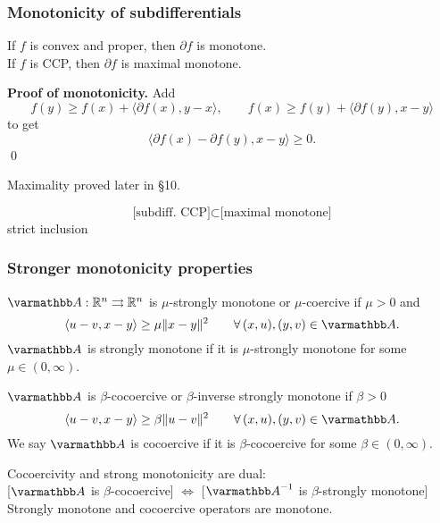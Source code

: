 \documentclass[10pt,mathserif]{beamer}
\begin{document}
\begin{frame}[plain]
\frametitle{Monotonicity of subdifferentials}
If $f$ is convex and proper, then $\partial f$ is monotone.\\
If $f$ is CCP, then $\partial f$ is maximal monotone.
\vspace{0.2in}

\textbf{Proof of monotonicity.}
Add
\[
f(y) \geq f(x) + \langle \partial f(x),y-x\rangle, \qquad f(x) \geq f(y) + \langle \partial f(y),x-y\rangle
\]
to get
\[
\langle\partial f(x)-\partial f(y),x-y\rangle\ge 0.
\]
\qed
\vspace{0.2in}


Maximality proved later in \S10.

\vspace{0.2in}


\[
\text{[subdiff.\ CCP]}\subset \text{[maximal monotone]}
\]
strict inclusion
\end{frame}


\begin{frame}
\frametitle{Stronger monotonicity properties}
$\opA:\reals^n\rightrightarrows\reals^n$ is $\mu$-strongly monotone or $\mu$-coercive
if $\mu>0$ and
\[
\langle u-v, x-y\rangle \geq \mu \|x-y\|^2
\qquad \forall\, (x,u),(y,v)\in \opA.
\]
$\opA $ is strongly monotone if it is $\mu$-strongly monotone for some $\mu \in(0,\infty)$.

\vspace{0.2in}

$\opA $ is $\beta$-cocoercive or $\beta$-inverse strongly monotone
if $\beta>0$
\[
\langle u-v, x-y\rangle \geq \beta \|u-v\|^2
\qquad \forall\, (x,u),(y,v)\in \opA.
\]
We say $\opA $ is cocoercive if it is $\beta$-cocoercive for some  $\beta\in(0,\infty)$.

\vspace{0.2in}
Cocoercivity and strong monotonicity are dual:\\

[$\opA $ is $\beta$-cocoercive] $\Leftrightarrow$ [$\opA ^{-1}$ is $\beta$-strongly monotone] \\

\vspace{0.2in}
Strongly monotone and cocoercive operators are monotone.
\end{frame}
\end{document}
